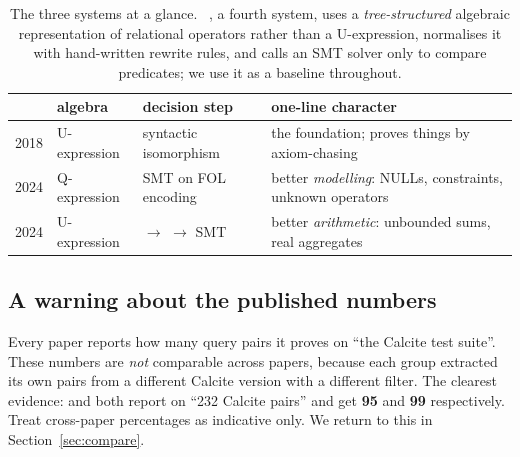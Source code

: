 \begin{table}[h]
\centering\small
\begin{tabularx}{\linewidth}{@{}l l l X@{}}
\toprule
 & \textbf{algebra} & \textbf{decision step} & \textbf{one-line character} \\
\midrule
\udp{} 2018      & U-expression & syntactic isomorphism & the foundation; proves things by axiom-chasing \\
\QED{} 2024      & Q-expression & SMT on FOL encoding   & better \emph{modelling}: NULLs, constraints, unknown operators \\
\sqlsolver{} 2024& U-expression & \liastar{} $\to$ \lia{} $\to$ SMT & better \emph{arithmetic}: unbounded sums, real aggregates \\
\bottomrule
\end{tabularx}
\caption{The three systems at a glance. \spes{}~\cite{spes}, a fourth system, uses a
\emph{tree-structured} algebraic representation of relational operators rather than a
U-expression, normalises it with hand-written rewrite rules, and calls an SMT solver only to
compare predicates; we use it as a baseline throughout.}
\end{table}

\subsection{A warning about the published numbers}

Every paper reports how many query pairs it proves on ``the Calcite test suite''. These
numbers are \emph{not} comparable across papers, because each group extracted its own pairs
from a different Calcite version with a different filter. The clearest evidence: \QED{} and
\sqlsolver{} both report \spes{} on ``232 Calcite pairs'' and get \textbf{95} and
\textbf{99} respectively. Treat cross-paper percentages as indicative only. We return to
this in Section~\ref{sec:compare}.
